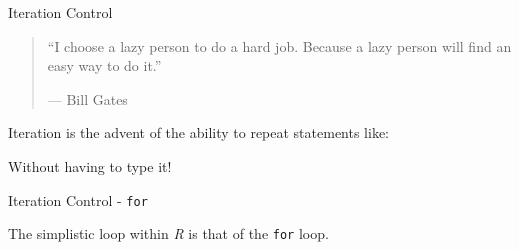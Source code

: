 \begin{frame}[fragile]{Iteration Control}

\begin{quote}
``I choose a lazy person to do a hard job. Because a lazy person will
find an easy way to do it.''

--- Bill Gates
\end{quote}

Iteration is the advent of the ability to repeat statements like:

\begin{Shaded}
\begin{Highlighting}[]
\NormalTok{(}\NormalTok{)}
\NormalTok{(}\NormalTok{)}
\NormalTok{(}\NormalTok{)}
\end{Highlighting}
\end{Shaded}

Without having to type it!

\end{frame}

\begin{frame}[fragile]{Iteration Control - \texttt{for}}

The simplistic loop within \emph{R} is that of the \texttt{for} loop.

\begin{Shaded}
\begin{Highlighting}[]
\StringTok{ }             
\NormalTok{:}\NormalTok{) \{       }
  \StringTok{ }\StringTok{ }
\NormalTok{\}}
\end{Highlighting}
\end{Shaded}

\end{frame}

